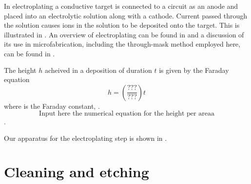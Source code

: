 In electroplating a conductive target is connected to a circuit as an anode and
placed into an electrolytic solution along with a cathode. Current passed
through the solution causes ions in the solution to be deposited onto the
target. This is illustrated in . An overview
of electroplating can be found in  and a
discussion of its use in microfabrication, including the through-mask method
employed here, can be found in .

The height $h$ acheived in a deposition of duration $t$ is given by the Faraday
equation~\cite{Schlesinger2011}
%
\begin{equation}
  h = \left(\frac{???}{???}\right)t
\end{equation}
%
where  is the Faraday constant, .
%
\begin{equation}
  \text{Input here the numerical equation for the height per areaa}
\end{equation}.
%

Our apparatus for the electroplating step is shown in
. 





\section{Cleaning and etching}


